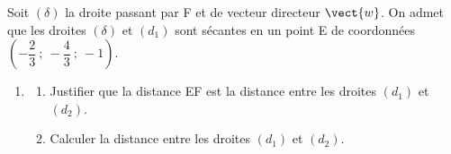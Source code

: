 Soit $(\delta)$ la droite passant par F et de vecteur directeur $\vect{w}$. On admet que les droites $(\delta)$ et $(d_1)$ sont sécantes en un point E de coordonnées $\left( -\dfrac23~;~- \dfrac43~;~-1\right)$.

	\begin{enumerate}[resume]
\item 
	\begin{enumerate}
		\item Justifier que la distance EF est la distance entre les droites $(d_1)$ et $(d_2)$. 
		\item Calculer la distance entre les droites $(d_1)$ et $(d_2)$.
	\end{enumerate}
\end{enumerate}

